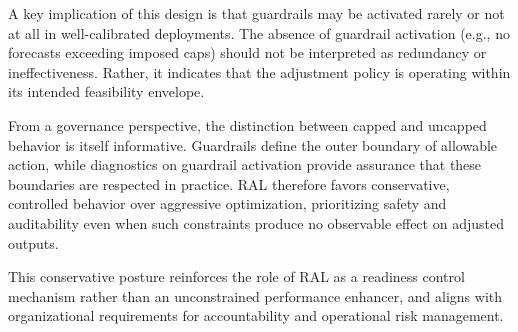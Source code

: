 A key implication of this design is that guardrails may be activated rarely or
not at all in well-calibrated deployments. The absence of guardrail activation
(e.g., no forecasts exceeding imposed caps) should not be interpreted as
redundancy or ineffectiveness. Rather, it indicates that the adjustment policy is
operating within its intended feasibility envelope.

From a governance perspective, the distinction between capped and uncapped
behavior is itself informative. Guardrails define the outer boundary of allowable
action, while diagnostics on guardrail activation provide assurance that these
boundaries are respected in practice. RAL therefore favors conservative,
controlled behavior over aggressive optimization, prioritizing safety and
auditability even when such constraints produce no observable effect on adjusted
outputs.

This conservative posture reinforces the role of RAL as a readiness control
mechanism rather than an unconstrained performance enhancer, and aligns with
organizational requirements for accountability and operational risk management.
